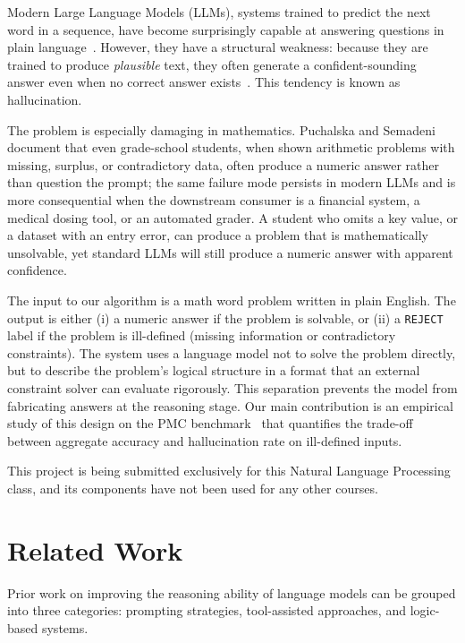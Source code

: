 \documentclass[sigconf, nonacm, onecolumn]{acmart}
\begin{document}
Modern Large Language Models (LLMs), systems trained to predict the next word
in a sequence, have become surprisingly capable at answering questions in
plain language~\cite{brown2020}. However, they have a structural weakness:
because they are trained to produce \textit{plausible} text, they often
generate a confident-sounding answer even when no correct answer
exists~\cite{huang2025}. This tendency is known as hallucination.

The problem is especially damaging in mathematics. Puchalska and
Semadeni~\cite{puchalska1987} document that even grade-school students,
when shown arithmetic problems with missing, surplus, or contradictory
data, often produce a numeric answer rather than question the prompt; the
same failure mode persists in modern LLMs and is more consequential when
the downstream consumer is a financial system, a medical dosing tool, or
an automated grader. A student who omits a key value, or a dataset with
an entry error, can produce a problem that is mathematically unsolvable,
yet standard LLMs will still produce a numeric answer with apparent
confidence.

The input to our algorithm is a math word problem written in plain English.
The output is either (i) a numeric answer if the problem is solvable, or (ii)
a \texttt{REJECT} label if the problem is ill-defined (missing information or
contradictory constraints). The system uses a language model not to solve the
problem directly, but to describe the problem's logical structure in a format
that an external constraint solver can evaluate rigorously. This separation
prevents the model from fabricating answers at the reasoning stage. Our main
contribution is an empirical study of this design on the PMC
benchmark~\cite{zhou2024} that quantifies the trade-off between aggregate
accuracy and hallucination rate on ill-defined inputs.

This project is being submitted exclusively for this Natural Language
Processing class, and its components have not been used for any other courses.

\section{Related Work}

Prior work on improving the reasoning ability of language models can be
grouped into three categories: prompting strategies, tool-assisted approaches,
and logic-based systems.
\end{document}

